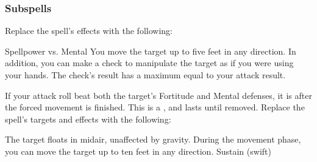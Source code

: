 \subsubsection{Subspells}
Replace the spell's effects with the following:
\begin{spellcontent}
\begin{augmenteffects}
\begin{spellattack}{Spellpower vs. Mental}
\spellsuccess
You move the target up to five feet in any direction.
In addition, you can make a check to manipulate the target as if you were using your hands.
The check's result has a maximum equal to your attack result.
\end{spellattack}
\end{augmenteffects}
\end{spellcontent}
If your attack roll beat both the target's Fortitude and Mental defenses, it is \immobilized after the forced movement is finished.
This is a , and lasts until removed.
Replace the spell's targets and effects with the following:
\begin{spellcontent}
\begin{augmenttargetinginfo}
\end{augmenttargetinginfo}
\begin{augmenteffects}
\spelleffect
The target floats in midair, unaffected by gravity.
During the movement phase, you can move the target up to ten feet in any direction.
\spelldur Sustain (swift)
\end{augmenteffects}
\end{spellcontent}
